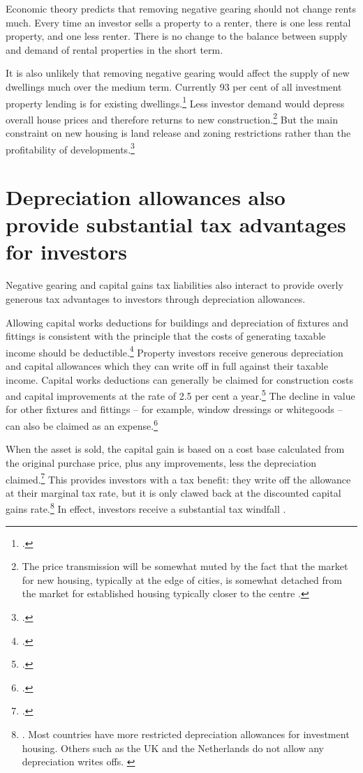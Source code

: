 \documentclass{grattan}\usepackage[]{graphicx}\usepackage[]{color}
\begin{document}
Economic theory predicts that removing negative gearing should not change rents much. Every time an investor sells a property to a renter, there is one less rental property, and one less renter. There is no change to the balance between supply and demand of rental properties in the short term. 

It is also unlikely that removing negative gearing would affect the supply of new dwellings much over the medium term. Currently 93 per cent of all investment property lending is for existing dwellings.\footcite{ABS2015} Less investor demand would depress overall house prices and therefore returns to new construction.\footnote{The price transmission will be somewhat muted by the fact that the market for new housing, typically at the edge of cities, is somewhat detached from the market for established housing typically closer to the centre \textcite[See]{Kelly2011}.} But the main constraint on new housing is land release and zoning restrictions rather than the profitability of developments.\footcite[pp.84-90]{Kelly2013}

\section{Depreciation allowances also provide substantial tax advantages for investors}
Negative gearing and capital gains tax liabilities also interact to provide overly generous tax advantages to investors through depreciation allowances. 

Allowing capital works deductions for buildings and depreciation of fixtures and fittings is consistent with the principle that the costs of generating taxable income should be deductible.\footcite{Commission2004}  Property investors receive generous depreciation and capital allowances which they can write off in full against their taxable income. Capital works deductions can generally be claimed for construction costs and capital improvements at the rate of 2.5 per cent a year.\footcite{ATO2014b} The decline in value for other fixtures and fittings -- for example, window dressings or whitegoods -- can also be claimed as an expense.\footcite{ATO2014c}

When the asset is sold, the capital gain is based on a cost base calculated from the original purchase price, plus any improvements, less the depreciation claimed.\footcite[p.~21]{ATO2014d} This provides investors with a tax benefit: they write off the allowance at their marginal tax rate, but it is only clawed back at the discounted capital gains rate.\footnote{\textcite{RBA2014}. Most countries have more restricted depreciation allowances for investment housing. Others such as the UK and the Netherlands do not allow any depreciation writes offs. \textcite{Commission2004}}  In effect, investors receive a substantial tax windfall .  
\end{document}

